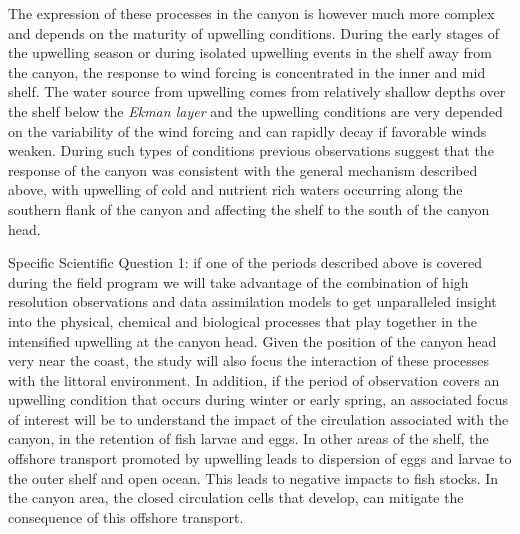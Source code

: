 The expression of these processes in the \naz canyon is however much
more complex and depends on the maturity of upwelling
conditions. During the early stages of the upwelling season or during
isolated upwelling events in the shelf away from the canyon, the
response to wind forcing is concentrated in the inner and mid
shelf. The water source from upwelling comes from relatively shallow
depths over the shelf below the \emph{Ekman layer} and the upwelling
conditions are very depended on the variability of the wind forcing
and can rapidly decay if favorable winds weaken.  During such types of
conditions previous observations suggest that the response of the \naz
canyon was consistent with the general mechanism described above, with
upwelling of cold and nutrient rich waters occurring along the
southern flank of the canyon and affecting the shelf to the south of
the canyon head.
 
\textsf{Specific Scientific Question 1:} if one of the periods
described above is covered during the \proj field program we will take
advantage of the combination of high resolution observations and data
assimilation models to get unparalleled insight into the physical,
chemical and biological processes that play together in the
intensified upwelling at the \naz canyon head. Given the position of
the canyon head very near the coast, the study will also focus the
interaction of these processes with the littoral environment. In
addition, if the period of observation covers an upwelling condition
that occurs during winter or early spring, an associated focus of
interest will be to understand the impact of the circulation
associated with the canyon, in the retention of fish larvae and
eggs. In other areas of the shelf, the offshore transport promoted by
upwelling leads to dispersion of eggs and larvae to the outer shelf
and open ocean. This leads to negative impacts to fish stocks. In the
canyon area, the closed circulation cells that develop, can mitigate
the consequence of this offshore transport.

